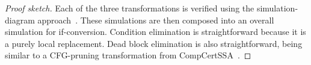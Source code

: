 \begin{theorem}
  \begin{proof}[Proof sketch]
Each of the three transformations is verified using the
simulation-diagram approach~\cite[p.~379]{leroy09_formal_verif_compil_back_end}. These simulations are then composed into an overall
simulation for if-conversion.
    Condition elimination is straightforward
    because it is a purely local replacement. %
    Dead block elimination is also straightforward, being
    similar to a CFG-pruning transformation from CompCertSSA~\cite{barthe14_formal_verif_ssa_based_middl_end_compc}.

\end{proof}
\end{theorem}
